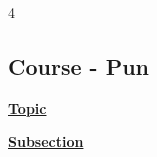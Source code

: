 \documentclass[landscape, 8pt]{extarticle}
\begin{document}
	
\fontsize{5pt}{6pt} \selectfont
	
\setlength\tabcolsep{4.5pt}
\setlength\extrarowheight{2pt}
	
\setlength{\abovedisplayskip}{0pt}
\setlength{\belowdisplayskip}{0pt}
\setlength{\abovedisplayshortskip}{0pt}
\setlength{\belowdisplayshortskip}{0pt}

\begin{multicols*}{4}
	\raggedcolumns 
	\vspace{-5pt}
	\subsection*{Course - Pun}
	\vspace{-5pt}
	

{\footnotesize \textbf{\underline{Topic}}}
	
	{\tiny\textbf{\underline{Subsection}}}
		
		
		
		
		
\end{multicols*}	
	
\end{document}

